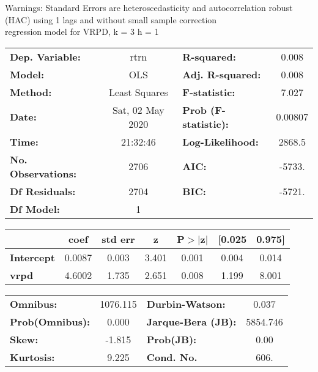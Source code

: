 Warnings: \newline
 [1] Standard Errors are heteroscedasticity and autocorrelation robust (HAC) using 1 lags and without small sample correction\\ 

regression model for VRPD, k = 3 h = 1\begin{center}
\begin{tabular}{lclc}
\toprule
\textbf{Dep. Variable:}    &       rtrn       & \textbf{  R-squared:         } &     0.008   \\
\textbf{Model:}            &       OLS        & \textbf{  Adj. R-squared:    } &     0.008   \\
\textbf{Method:}           &  Least Squares   & \textbf{  F-statistic:       } &     7.027   \\
\textbf{Date:}             & Sat, 02 May 2020 & \textbf{  Prob (F-statistic):} &  0.00807    \\
\textbf{Time:}             &     21:32:46     & \textbf{  Log-Likelihood:    } &    2868.5   \\
\textbf{No. Observations:} &        2706      & \textbf{  AIC:               } &    -5733.   \\
\textbf{Df Residuals:}     &        2704      & \textbf{  BIC:               } &    -5721.   \\
\textbf{Df Model:}         &           1      & \textbf{                     } &             \\
\bottomrule
\end{tabular}
\begin{tabular}{lcccccc}
                   & \textbf{coef} & \textbf{std err} & \textbf{z} & \textbf{P$> |$z$|$} & \textbf{[0.025} & \textbf{0.975]}  \\
\midrule
\textbf{Intercept} &       0.0087  &        0.003     &     3.401  &         0.001        &        0.004    &        0.014     \\
\textbf{vrpd}      &       4.6002  &        1.735     &     2.651  &         0.008        &        1.199    &        8.001     \\
\bottomrule
\end{tabular}
\begin{tabular}{lclc}
\textbf{Omnibus:}       & 1076.115 & \textbf{  Durbin-Watson:     } &    0.037  \\
\textbf{Prob(Omnibus):} &   0.000  & \textbf{  Jarque-Bera (JB):  } & 5854.746  \\
\textbf{Skew:}          &  -1.815  & \textbf{  Prob(JB):          } &     0.00  \\
\textbf{Kurtosis:}      &   9.225  & \textbf{  Cond. No.          } &     606.  \\
\bottomrule
\end{tabular}
\end{center}

